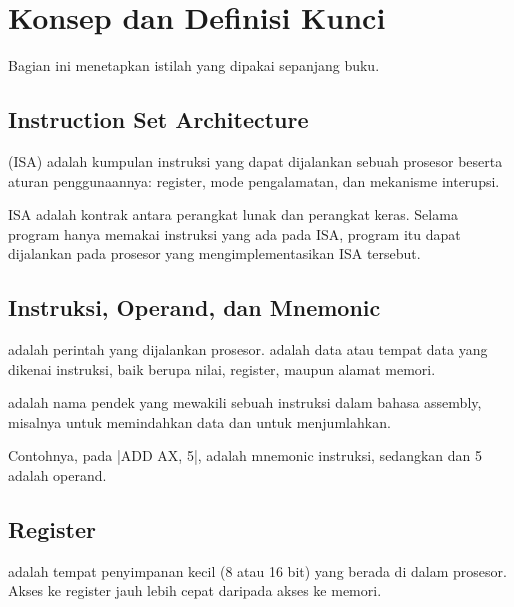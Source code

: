 \section{Konsep dan Definisi Kunci}
\label{sec:konsep-kunci}

Bagian ini menetapkan istilah yang dipakai sepanjang buku.

\subsection{Instruction Set Architecture}

\begin{definisi}
 (ISA) adalah kumpulan instruksi
yang dapat dijalankan sebuah prosesor beserta aturan penggunaannya:
register, mode pengalamatan, dan mekanisme interupsi.
\end{definisi}

ISA adalah kontrak antara perangkat lunak dan perangkat keras. Selama
program hanya memakai instruksi yang ada pada ISA, program itu dapat
dijalankan pada prosesor yang mengimplementasikan ISA tersebut.

\subsection{Instruksi, Operand, dan Mnemonic}

\begin{definisi}
 adalah perintah yang dijalankan prosesor.
 adalah data atau tempat data yang dikenai instruksi,
baik berupa nilai, register, maupun alamat memori.
\end{definisi}

\begin{definisi}[Mnemonic]
 adalah nama pendek yang mewakili sebuah instruksi
dalam bahasa assembly, misalnya  untuk memindahkan data dan
 untuk menjumlahkan.
\end{definisi}

Contohnya, pada \lstasm|ADD AX, 5|,  adalah mnemonic
instruksi, sedangkan  dan 5 adalah operand.

\subsection{Register}

\begin{definisi}[Register]
 adalah tempat penyimpanan kecil (8 atau 16 bit) yang
berada di dalam prosesor. Akses ke register jauh lebih cepat daripada
akses ke memori.
\end{definisi}

